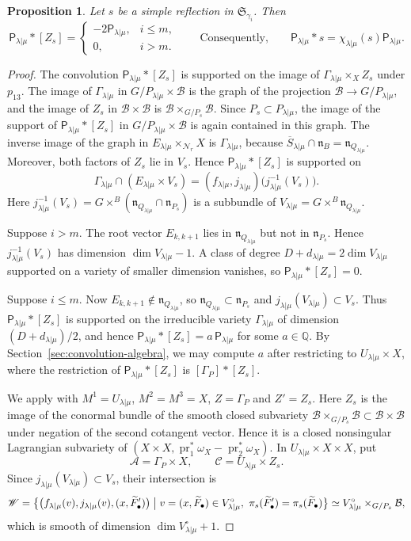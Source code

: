 \documentclass[11pt,a4paper]{amsart}
\newtheorem{proposition}[theorem]{Proposition}
\theoremstyle{definition}
\theoremstyle{remark}
\newcommand{\Q}{\mathbb Q}
\newcommand{\N}{\mathcal N}
\newcommand{\B}{\mathcal B}
\newcommand{\pr}{\operatorname{pr}}
\newcommand{\lm}{\lambda|\mu}
\numberwithin{equation}{section}
\begin{document}
\begin{proposition}\label{prop:reflection}
Let $s$ be a simple reflection in $\mathfrak S_{\gamma_i}$. Then
\begin{equation}\label{eq:reflection}
\mathsf P_{\lm}*[Z_s]=
\begin{cases}
-2\mathsf P_{\lm},&i\le m,\\
0,&i>m.
\end{cases}
\qquad\text{Consequently,}\qquad \mathsf P_{\lm}*s=\chi_{\lm}(s)\mathsf P_{\lm}.
\end{equation}
\end{proposition}
\begin{proof}
The convolution $\mathsf P_{\lm}*[Z_s]$ is
supported on the image of $\Gamma_{\lm}\times_XZ_s$ under $p_{13}$. The
image of $\Gamma_{\lm}$ in $G/P_{\lm}\times\B$ is the graph of the
projection $\B\to G/P_{\lm}$, and the image of $Z_s$ in $\B\times\B$ is
$\B\times_{G/P_s}\B$. Since $P_s\subset P_{\lm}$, the image of the
support of $\mathsf P_{\lm}*[Z_s]$ in $G/P_{\lm}\times\B$ is again
contained in this graph.
The inverse image of the graph in $E_{\lm}\times_{\N_r}X$ is
$\Gamma_{\lm}$, because $\overline S_{\lm}\cap\mathfrak n_B
=\mathfrak n_{Q_{\lm}}$. Moreover, both factors of $Z_s$ lie in $V_s$.
Hence $\mathsf P_{\lm}*[Z_s]$ is supported on
$$
\Gamma_{\lm}\cap(E_{\lm}\times V_s)
=(f_{\lm},j_{\lm})\bigl(j_{\lm}^{-1}(V_s)\bigr).
$$
Here $j_{\lm}^{-1}(V_s)=G\times^B(\mathfrak n_{Q_{\lm}}\cap\mathfrak n_{P_s})$
is a subbundle of $V_{\lm}=G\times^B\mathfrak n_{Q_{\lm}}$.

Suppose $i>m$. The root vector $E_{k,k+1}$ lies in $\mathfrak n_{Q_{\lm}}$
but not in $\mathfrak n_{P_s}$. Hence $j_{\lm}^{-1}(V_s)$ has dimension
$\dim V_{\lm}-1$. A class of degree
$D+d_{\lm}=2\dim V_{\lm}$ supported on a variety of smaller dimension
vanishes, so $\mathsf P_{\lm}*[Z_s]=0$.

Suppose $i\le m$. Now $E_{k,k+1}\notin\mathfrak n_{Q_{\lm}}$, so
$\mathfrak n_{Q_{\lm}}\subset\mathfrak n_{P_s}$ and $j_{\lm}(V_{\lm})\subset V_s$.
Thus $\mathsf P_{\lm}*[Z_s]$ is supported on the irreducible variety
$\Gamma_{\lm}$ of dimension $(D+d_{\lm})/2$, and hence
$\mathsf P_{\lm}*[Z_s]=a\,\mathsf P_{\lm}$ for some $a\in\Q$. By
Section~\ref{sec:convolution-algebra}, we may compute $a$ after restricting
to $U_{\lm}\times X$, where the restriction of $\mathsf P_{\lm}*[Z_s]$ is
$[\Gamma_P]*[Z_s]$.

We apply \cite[Lemma~8.5]{Nak} with $M^1=U_{\lm}$, $M^2=M^3=X$,
$Z=\Gamma_P$ and $Z'=Z_s$. Here $Z_s$ is the image of the conormal bundle
of the smooth closed subvariety $\B\times_{G/P_s}\B\subset\B\times\B$ under
negation of the second cotangent vector. Hence it is a closed nonsingular
Lagrangian subvariety of $(X\times X,\pr_1^*\omega_X-\pr_2^*\omega_X)$.
In $U_{\lm}\times X\times X$, put
$$
\mathscr A=\Gamma_P\times X,\qquad \mathscr C=U_{\lm}\times Z_s .
$$
Since $j_{\lm}(V_{\lm})\subset V_s$, their intersection is
$$
\mathscr W=\bigl\{\bigl(f_{\lm}(v),j_{\lm}(v),(x,\widetilde F'_\bullet)\bigr)\bigm|
v=(x,\widetilde F_\bullet)\in V^\circ_{\lm},\
\pi_s(\widetilde F'_\bullet)=\pi_s(\widetilde F_\bullet)\bigr\}
\simeq V^\circ_{\lm}\times_{G/P_s}\B,
$$
which is smooth of dimension $\dim V^\circ_{\lm}+1$.


\end{proof}
\end{document}
